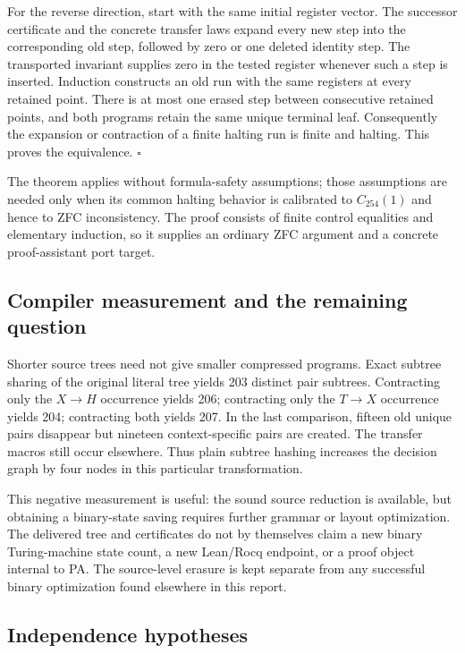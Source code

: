 For the reverse direction, start with the same initial register vector.
The successor certificate and the concrete transfer laws expand every new
step into the corresponding old step, followed by zero or one deleted
identity step.  The transported invariant supplies zero in the tested
register whenever such a step is inserted.  Induction constructs an old
run with the same registers at every retained point.  There is at most one
erased step between consecutive retained points, and both programs retain
the same unique terminal leaf.  Consequently the expansion or contraction
of a finite halting run is finite and halting.  This proves the equivalence.
\hfill$\square$

The theorem applies without formula-safety assumptions; those assumptions
are needed only when its common halting behavior is calibrated to
$C_{254}(1)$ and hence to ZFC inconsistency.  The proof consists of finite
control equalities and elementary induction, so it supplies an ordinary
ZFC argument and a concrete proof-assistant port target.

\subsection{Compiler measurement and the remaining question}

Shorter source trees need not give smaller compressed programs.  Exact
subtree sharing of the original literal tree yields 203 distinct pair
subtrees.  Contracting only the $X\to H$ occurrence yields 206; contracting
only the $T\to X$ occurrence yields 204; contracting both yields 207.
In the last comparison, fifteen old unique pairs disappear but nineteen
context-specific pairs are created.  The transfer macros still occur
elsewhere.  Thus plain subtree hashing increases the decision graph by
four nodes in this particular transformation.

This negative measurement is useful: the sound source reduction is
available, but obtaining a binary-state saving requires further grammar or
layout optimization.  The delivered tree and certificates do not by
themselves claim a new binary Turing-machine state count, a new Lean/Rocq
endpoint, or a proof object internal to PA.  The source-level erasure is
kept separate from any successful binary optimization found elsewhere in
this report.

\subsection{Independence hypotheses}

